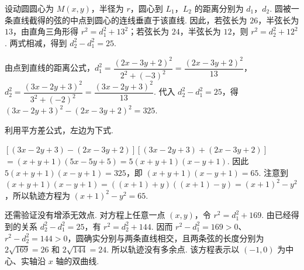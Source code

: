 \begin{solution}
设动圆圆心为 \(M\left(x,y\right)\)，半径为 \(r\)，圆心到 \(L_1\)，\(L_2\) 的距离分别为 \(d_1\)，\(d_2\). 圆被一条直线截得的弦的中点到圆心的连线垂直于该直线. 因此，若弦长为 \(26\)，半弦长为 \(13\)，由直角三角形得 \(r^2=d_1^2+13^2\)；若弦长为 \(24\)，半弦长为 \(12\)，则 \(r^2=d_2^2+12^2\). 两式相减，得到 \(d_2^2-d_1^2=25\).

由点到直线的距离公式，\(d_1^2=\dfrac{\left(2x-3y+2\right)^2}{2^2+(-3)^2}=\dfrac{\left(2x-3y+2\right)^2}{13}\)，\(d_2^2=\dfrac{\left(3x-2y+3\right)^2}{3^2+(-2)^2}=\dfrac{\left(3x-2y+3\right)^2}{13}\). 代入 \(d_2^2-d_1^2=25\)，得
\(\left(3x-2y+3\right)^2-\left(2x-3y+2\right)^2=325\).

利用平方差公式，左边为下式.

\(\left[(3x-2y+3)-(2x-3y+2)\right]\left[(3x-2y+3)+(2x-3y+2)\right]\)
\(=(x+y+1)(5x-5y+5)=5(x+y+1)(x-y+1)\).
因此 \(5(x+y+1)(x-y+1)=325\)，即
\((x+y+1)(x-y+1)=65\). 注意到
\((x+y+1)(x-y+1)=\left((x+1)+y\right)\left((x+1)-y\right)=(x+1)^2-y^2\)，所以轨迹方程为
\((x+1)^2-y^2=65\).

还需验证没有增添无效点. 对方程上任意一点 \(\left(x,y\right)\)，令 \(r^2=d_1^2+169\). 由已经得到的关系 \(d_2^2-d_1^2=25\)，有 \(r^2=d_2^2+144\). 因而 \(r^2-d_1^2=169>0\)、\(r^2-d_2^2=144>0\)，圆确实分别与两条直线相交，且两条弦的长度分别为 \(2\sqrt{169}=26\) 和 \(2\sqrt{144}=24\). 所以轨迹没有多余点. 该方程表示以 \(\left(-1,0\right)\) 为中心、实轴沿 \(x\) 轴的双曲线.
\end{solution}
